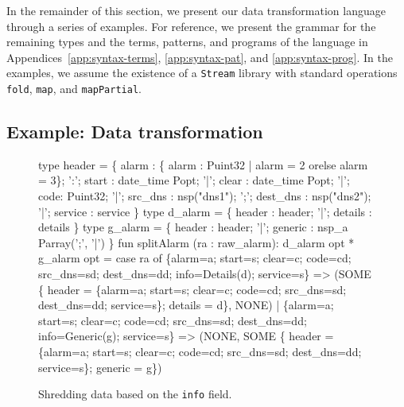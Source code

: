 In the remainder of this section, we present our data transformation
language through a series of examples.  For reference, we present the
grammar for the remaining types and the terms, patterns, and programs
of the language in Appendices~\ref{app:syntax-terms},
\ref{app:syntax-pat}, and \ref{app:syntax-prog}.  In the examples, we
assume the existence of a \texttt{Stream} library with standard
operations \texttt{fold}, \texttt{map}, and \texttt{mapPartial}.

\subsection{Example: Data transformation}
\begin{figure}
  \centering
  \begin{code}

type header = \{
       alarm : \{ alarm : Puint32 | alarm = 2 
                                    orelse alarm = 3\};
 ':';  start :  date_time Popt;
 '|';  clear :  date_time Popt;
 '|';  code: Puint32;
 '|';  src_dns  :  nsp("dns1");
 ';';  dest_dns :  nsp("dns2");
 '|';  service  : service
\}
  \mbox{}
type d_alarm = \{
       header   : header;
 '|';  details  : details
 \}
\mbox{}
type g_alarm = \{
       header   : header;
 '|';  generic  : nsp_a Parray(';', '|')
\}
\mbox{}
fun splitAlarm (ra : raw_alarm): d_alarm opt * g_alarm opt
  = case ra of
        \{alarm=a; start=s; clear=c; code=cd; src_dns=sd; 
         dest_dns=dd; info=Details(d); service=s\} 
        => 
        (SOME \{ header = \{alarm=a; start=s; clear=c; 
                          code=cd; src_dns=sd; 
                          dest_dns=dd; service=s\};
                details = d\}, 
         NONE)
      | \{alarm=a; start=s; clear=c; code=cd; src_dns=sd; 
         dest_dns=dd; info=Generic(g); service=s\} 
        => 
        (NONE,
         SOME \{ header = \{alarm=a; start=s; clear=c; 
                          code=cd; src_dns=sd; 
                          dest_dns=dd; service=s\};
                generic = g\})    
  \end{code}
  \caption{Shredding \darkstar{} data based on the {\tt info} field.}
  \label{fig:ex-no-err-check}
\end{figure}


